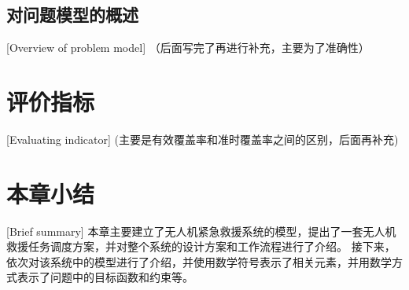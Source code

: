 \subsection{对问题模型的概述}[Overview of problem model]
（后面写完了再进行补充，主要为了准确性）

\section{评价指标}[Evaluating indicator]
(主要是有效覆盖率和准时覆盖率之间的区别，后面再补充)
\section{本章小结}[Brief summary]
本章主要建立了无人机紧急救援系统的模型，提出了一套无人机救援任务调度方案，并对整个系统的设计方案和工作流程进行了介绍。
接下来，依次对该系统中的模型进行了介绍，并使用数学符号表示了相关元素，并用数学方式表示了问题中的目标函数和约束等。

